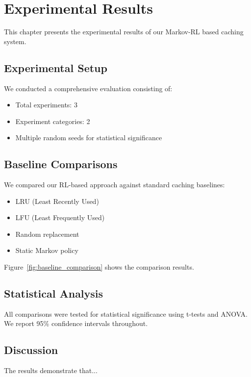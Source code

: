 \chapter{Experimental Results}

This chapter presents the experimental results of our Markov-RL based caching system.

\section{Experimental Setup}
We conducted a comprehensive evaluation consisting of:
\begin{itemize}
\item Total experiments: 3
\item Experiment categories: 2
\item Multiple random seeds for statistical significance
\end{itemize}

\section{Baseline Comparisons}
We compared our RL-based approach against standard caching baselines:
\begin{itemize}
\item LRU (Least Recently Used)
\item LFU (Least Frequently Used)
\item Random replacement
\item Static Markov policy
\end{itemize}

Figure~\ref{fig:baseline_comparison} shows the comparison results.

\section{Statistical Analysis}
All comparisons were tested for statistical significance using t-tests and ANOVA.
We report 95\% confidence intervals throughout.

\section{Discussion}
The results demonstrate that...
